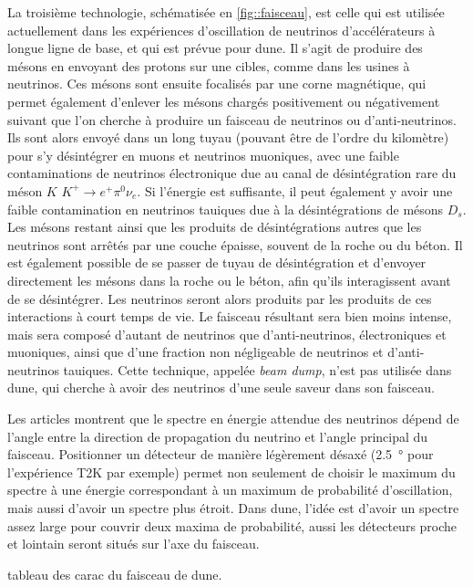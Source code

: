             La troisième technologie, schématisée en \autoref{fig::faisceau}, est celle qui est utilisée actuellement dans les expériences d'oscillation de neutrinos d'accélérateurs à longue ligne de base, et qui est prévue pour \gls{dune}. Il s'agit de produire des mésons en envoyant des protons sur une cibles, comme dans les usines à neutrinos. Ces mésons sont ensuite focalisés par une corne magnétique, qui permet également d'enlever les mésons chargés positivement ou négativement suivant que l'on cherche à produire un faisceau de neutrinos ou d'anti-neutrinos. Ils sont alors envoyé dans un long tuyau (pouvant être de l'ordre du kilomètre) pour s'y désintégrer en muons et neutrinos muoniques, avec une faible contaminations de neutrinos électronique due au canal de désintégration rare du méson $K$ $K^+ \to e^+ \pi^0 \nu_e$. Si l'énergie est suffisante, il peut également y avoir une faible contamination en neutrinos tauiques due à la désintégrations de mésons $D_s$. Les mésons restant ainsi que les produits de désintégrations autres que les neutrinos sont arrêtés par une couche épaisse, souvent de la roche ou du béton. Il est également possible de se passer de tuyau de désintégration et d'envoyer directement les mésons dans la roche ou le béton, afin qu'ils interagissent avant de se désintégrer. Les neutrinos seront alors produits par les produits de ces interactions à court temps de vie. Le faisceau résultant sera bien moins intense, mais sera composé d'autant de neutrinos que d'anti-neutrinos, électroniques et muoniques, ainsi que d'une fraction non négligeable de neutrinos et d'anti-neutrinos tauiques. Cette technique, appelée \textit{beam dump}, n'est pas utilisée dans \gls{dune}, qui cherche à avoir des neutrinos d'une seule saveur dans son faisceau.
            
            Les articles \cite{Levy2010,McDonald2001,Itow2001} montrent que le spectre en énergie attendue des neutrinos dépend de l'angle entre la direction de propagation du neutrino et l'angle principal du faisceau. Positionner un détecteur de manière légèrement désaxé (\SI{2.5}{\degree} pour l'expérience T2K par exemple) permet non seulement de choisir le maximum du spectre à une énergie correspondant à un maximum de probabilité d'oscillation, mais aussi d'avoir un spectre plus étroit. Dans \gls{dune}, l'idée est d'avoir un spectre assez large pour couvrir deux maxima de probabilité, aussi les détecteurs proche et lointain seront situés sur l'axe du faisceau.
            
            
            tableau des carac du faisceau de dune.
            
